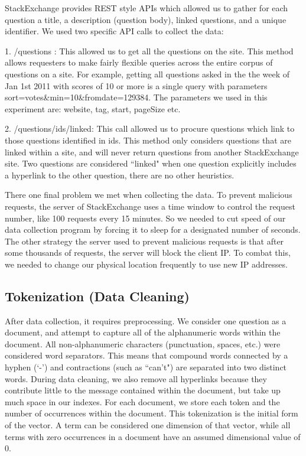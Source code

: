 \documentclass{acm_proc_article-sp}
\begin{document}
StackExchange provides REST style APIs which allowed us to gather for each question a title, a description (question body), linked questions, and a unique identifier. We used two specific API calls to collect the data:

1. /questions : This allowed us to get all the questions on the site. This method allows requesters to make fairly flexible queries across the entire corpus of questions on a site. For example, getting all questions asked in the the week of Jan 1st 2011 with scores of 10 or more is a single query with parameters sort=votes\&min=10\&fromdate=129384. The parameters we used in this experiment are: website, tag, start, pageSize  etc. 

2. /questions/{ids}/linked:  This call allowed us to procure questions which link to those questions identified in {ids}.  This method only considers questions that are linked within a site, and will never return questions from another StackExchange site. Two questions are considered   ``linked" when one question explicitly includes a hyperlink to the other question, there are no other heuristics.

There one final problem we met when collecting the data. To prevent malicious requests,  the server of StackExchange uses a time window to control the request number, like  100 requests every 15 minutes. So we needed to cut speed of our data collection program by forcing it to sleep for a designated number of seconds. The other strategy the server used to prevent malicious requests is that after some thousands of requests, the server will block the client IP. To combat this, we needed to change our physical location frequently to use new IP addresses.


\subsection{Tokenization (Data Cleaning)}
After data collection, it requires preprocessing. We consider one question as a document, and attempt to capture all of the alphanumeric words within the document. All non-alphanumeric characters (punctuation, spaces, etc.) were considered word separators. This means that compound words connected by a hyphen (`-') and contractions (such as ``can't") are separated into two distinct words. During data cleaning, we also remove all hyperlinks because they contribute little to the message contained within the document, but take up much space in our indexes. For each document, we store each token and the number of occurrences within the document. This tokenization is the initial form of the vector. A term can be considered one dimension of that vector, while all terms with zero occurrences in a document have an assumed dimensional value of 0.
\end{document}
